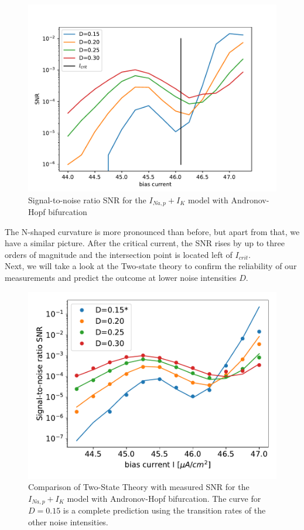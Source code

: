\documentclass[12pt,a4paper]{article}
\begin{document}
\begin{figure}[H]
	\centering
	\includegraphics[scale=1]{snranhopfcrit.pdf}\caption{Signal-to-noise ratio SNR for the $I_{Na,p}+I_K$ model with Andronov-Hopf bifurcation}
	\label{specanhopf}
\end{figure}
The N-shaped curvature is more pronounced than before, but apart from that, we have a similar picture. After the critical current, the SNR rises by up to three orders of magnitude and the intersection point is located left of $I_{crit}$. 
\\
Next, we will take a look at the Two-state theory to confirm the reliability of our measurements and predict the outcome at lower noise intensities $D$.
\begin{figure}[H]
	\centering
	\includegraphics[scale=1]{snrtwostatecompanhopf7mnofit3.pdf}\caption{Comparison of Two-State Theory with measured SNR for the $I_{Na,p}+I_K$ model with Andronov-Hopf bifurcation. The curve for $D=0.15$ is a complete prediction using the transition rates of the other noise intensities.}
 	\label{specanhopftst}
\end{figure}
\end{document}
